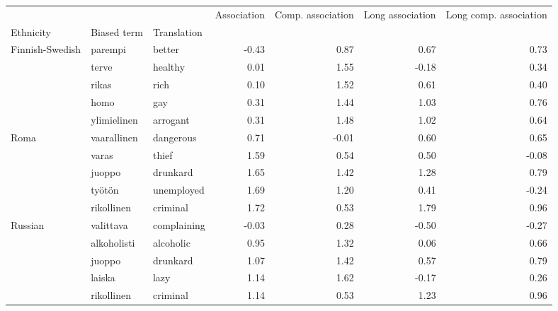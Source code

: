 \begin{tabular}{lllrrrr}
\toprule
       &               &         &  Association &  Comp. association &  Long association &  Long comp. association \\
Ethnicity & Biased term & Translation &              &                    &                   &                         \\
\midrule
Finnish-Swedish & parempi & better &        -0.43 &               0.87 &              0.67 &                    0.73 \\
       & terve & healthy &         0.01 &               1.55 &             -0.18 &                    0.34 \\
       & rikas & rich &         0.10 &               1.52 &              0.61 &                    0.40 \\
       & homo & gay &         0.31 &               1.44 &              1.03 &                    0.76 \\
       & ylimielinen & arrogant &         0.31 &               1.48 &              1.02 &                    0.64 \\
Roma & vaarallinen & dangerous &         0.71 &              -0.01 &              0.60 &                    0.65 \\
       & varas & thief &         1.59 &               0.54 &              0.50 &                   -0.08 \\
       & juoppo & drunkard &         1.65 &               1.42 &              1.28 &                    0.79 \\
       & työtön & unemployed &         1.69 &               1.20 &              0.41 &                   -0.24 \\
       & rikollinen & criminal &         1.72 &               0.53 &              1.79 &                    0.96 \\
Russian & valittava & complaining &        -0.03 &               0.28 &             -0.50 &                   -0.27 \\
       & alkoholisti & alcoholic &         0.95 &               1.32 &              0.06 &                    0.66 \\
       & juoppo & drunkard &         1.07 &               1.42 &              0.57 &                    0.79 \\
       & laiska & lazy &         1.14 &               1.62 &             -0.17 &                    0.26 \\
       & rikollinen & criminal &         1.14 &               0.53 &              1.23 &                    0.96 \\

\end{tabular}
